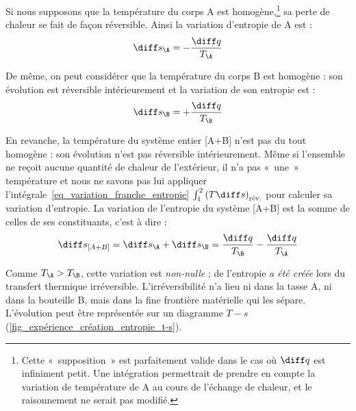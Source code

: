 		Si nous supposons que la température du corps A est homogène,\footnote{Cette «~supposition~» est parfaitement valide dans le cas où $\diff q$ est infiniment petit. Une intégration permettrait de prendre en compte la variation de température de A au cours de l’échange de chaleur, et le raisonnement ne serait pas modifié.}
		sa perte de chaleur se fait de façon réversible. Ainsi la variation d’entropie de A est :
		\begin{equation*}
			\diff s_\A = - \frac{\diff q}{T_\A}
		\end{equation*}

		De même, on peut considérer que la température du corps B est homogène : son évolution est réversible intérieurement et la variation de son entropie est :
		\begin{equation*}
			\diff s_\B = + \frac{\diff q}{T_\B }
		\end{equation*}

		En revanche, la température du système entier [A+B] n’est pas du tout homogène : son évolution n’est pas réversible intérieurement. Même si l’ensemble ne reçoit aucune quantité de chaleur de l’extérieur, il n’a pas «~une~» température et nous ne savons pas lui appliquer l’intégrale~\ref{eq_variation_franche_entropie} $\int_1^2 \left(T \diff s \right)_\text{rév.}$ pour calculer sa variation d’entropie. La variation de l’entropie du système [A+B] est la somme de celles de ses constituants, c’est à dire :
		\begin{equation}
			\diff s_{[A+B]} = \diff s_\A + \diff s_\B = \frac{\diff q}{T_\B } - \frac{\diff q}{T_\A}
		\end{equation}

		Comme $T_\A > T_\B$, cette variation est \emph{non-nulle} ; de l’entropie \emph{a été créée} lors du transfert thermique irréversible. L’irréversibilité n’a lieu ni dans la tasse A, ni dans la bouteille B, mais dans la fine frontière matérielle qui les sépare. L’évolution peut être représentée sur un diagramme $T-s$ (\cref{fig_expérience_création_entropie_t-s}).

